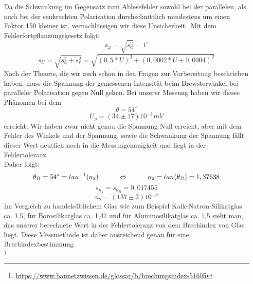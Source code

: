 Da die Schwankung im Gegensatz zum Ablesefehler sowohl bei der parallelen, als auch bei der senkrechten Polarisation durchschnittlich mindestens um einen Faktor 150 kleiner ist, vernachlässigen wir diese Unsicherheit.\
Mit dem Fehlerfortpflanzungsgesetz folgt:\
\begin{equation}
s_\varphi=\sqrt{s_a^2}=1^\circ
\end{equation}
\begin{equation}
s_U=\sqrt{s_a^2+s_r^2}=\sqrt{(0,5*U)^2+(0,0002*U+0,0004)^2}
\end{equation}
Nach der Theorie, die wir auch schon in den Fragen zur Vorbereitung beschrieben haben, muss die  Spannung der gemessenen Intensität beim Brewsterwinkel bei paralleler Polarisation gegen Null gehen. Bei unserer Messung haben wir dieses Phänomen bei dem\\
\begin{equation}
\theta = 54^\circ
\end{equation}
\begin{equation}
\boxed{U_{p}=(34\pm17)10^{-1} mV}
\end{equation}
erreicht. Wir haben zwar nicht genau die Spannung Null erreicht, aber mit dem Fehler des Winkels und der Spannung, sowie die Schwankung der Spannung fällt dieser Wert deutlich noch in die Messungenauigkeit und liegt in der Fehlertoleranz. \\
Daher folgt:\\
\begin{equation}
\theta_B=54^\circ=tan^{-1}(n_2) \tab \Leftrightarrow \tab n_2=tan(\theta_B)=1,37638
\end{equation}
\begin{equation}
s_{n_2}=s_{\theta_B}=0,017455
\end{equation}
\begin{equation}
\boxed{n_2=(137\pm2)10^{-3}}
\end{equation}
Im Vergleich zu handelsüblichem Glas wie zum Beispiel Kalk-Natron-Silikatglas ca. 1,5, für Borosilikatglas ca. 1,47 und für Aluminosilikatglas ca. 1,5 sieht man, das unserer berechnete Wert in der Fehlertoleranz von dem Brechindex von Glas liegt. Diese Messmethode ist daher ausreichend genau für eine Brechindexbestimmung. \\
\footnote{\url{https://www.baunetzwissen.de/glossar/b/brechungsindex-51605}}

